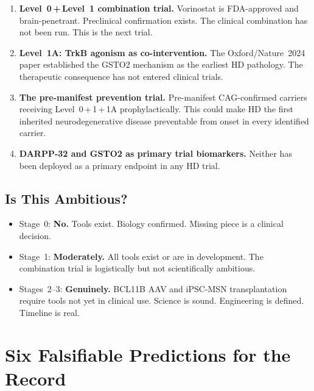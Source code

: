\documentclass[12pt,a4paper]{article}
\begin{document}
\begin{enumerate}
  \item \textbf{Level~0\,+\,Level~1 combination trial.}
    Vorinostat is FDA-approved and brain-penetrant.
    Preclinical confirmation exists. The clinical
    combination has not been run. This is the next trial.

  \item \textbf{Level~1A: TrkB agonism as co-intervention.}
    The Oxford/Nature~2024 paper established the GSTO2
    mechanism as the earliest HD pathology. The
    therapeutic consequence has not entered clinical
    trials.

  \item \textbf{The pre-manifest prevention trial.}
    Pre-manifest CAG-confirmed carriers receiving
    Level~0\,+\,1\,+\,1A prophylactically. This could make
    HD the first inherited neurodegenerative disease
    preventable from onset in every identified carrier.

  \item \textbf{DARPP-32 and GSTO2 as primary trial
    biomarkers.} Neither has been deployed as a primary
    endpoint in any HD trial.
\end{enumerate}

\subsection{Is This Ambitious?}

\begin{itemize}
  \item Stage~0: \textbf{No.} Tools exist. Biology
    confirmed. Missing piece is a clinical decision.

  \item Stage~1: \textbf{Moderately.} All tools exist or
    are in development. The combination trial is
    logistically but not scientifically ambitious.

  \item Stages~2--3: \textbf{Genuinely.} BCL11B AAV and
    iPSC-MSN transplantation require tools not yet in
    clinical use. Science is sound. Engineering is
    defined. Timeline is real.
\end{itemize}

\section{Six Falsifiable Predictions for the Record}
\end{document}
